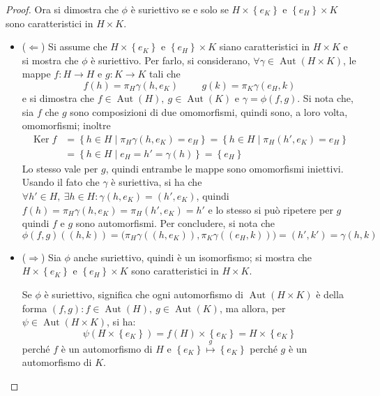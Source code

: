 \documentclass[12pt]{scrartcl}
\theoremstyle{style}
\numberwithin{equation}{subsection}
\begin{document}
\begin{proof}
Ora si dimostra che $\phi $ \`e suriettivo se e solo se $H \times \left\{ e_K \right\} $ e $\left\{ e_H \right\} \times K$ sono caratteristici in $H\times K$.
\begin{itemize}
	\item ($\Leftarrow $) Si assume che $H \times \left\{ e_K \right\} $ e $\left\{ e_H \right\} \times K$ siano caratteristici in $H \times K$ e si mostra che $\phi $ \`e suriettivo.
		Per farlo, si considerano, $\forall \gamma \in  \operatorname{Aut} (H \times K)$, le mappe $f: H \to H$ e $g : K \to K $ tali che
		\[
		f(h) = \pi_H \gamma(h,e_K) \hspace{1cm} g(k) = \pi_K \gamma(e_H,k)
		\] 
		e si dimostra che $f \in \operatorname{Aut} (H), \ g\in \operatorname{Aut} (K)$ e $\gamma = \phi (f,g)$.
		Si nota che, sia $f$ che $g$ sono composizioni di due omomorfismi, quindi sono, a loro volta, omomorfismi; inoltre
		\[
		\begin{split}
				\operatorname{Ker} f &= \left\{ h \in H  \mid \pi _H \gamma(h,e_K) = e_H \right\} = \left\{ h \in H  \mid \pi_H ( h', e_K) = e_H \right\} \\
						     &= \left\{ h \in H  \mid e_H = h'= \gamma(h) \right\} = \left\{ e_H \right\} 
		\end{split}
		\] 
	Lo stesso vale per $g$, quindi entrambe le mappe sono omomorfismi iniettivi.
	Usando il fato che $\gamma$ \`e suriettiva, si ha che $\forall h' \in  H , \ \exists h \in H : \gamma(h,e_K) = (h',e_K)$, quindi $f(h) = \pi_H \gamma(h,e_K) = \pi_H(h',e_K) = h'$ e lo stesso si pu\`o ripetere per $g$ quindi $f$ e $g$ sono automorfismi.
	Per concludere, si nota che
	\[
	\phi (f,g)((h,k)) = \big(\pi_H \gamma((h,e_K)),\pi_K \gamma((e_H,k))\big) = (h',k') = \gamma(h,k)
	\] 
\item ($\Rightarrow $) Sia $\phi $ anche suriettivo, quindi \`e un isomorfismo; si mostra che $H \times \left\{ e_K \right\} $ e $\left\{ e_ H\right\}  \times  K$ sono caratteristici in $H \times K$.

	Se $\phi  $ \`e suriettivo, significa che ogni automorfismo di $\operatorname{Aut} (H \times K) $ \`e della forma $(f,g) : f \in \operatorname{Aut} (H) , \ g \in \operatorname{Aut} (K)$, ma allora, per $\psi  \in  \operatorname{Aut}(H \times K )$, si ha:
	\[
	\psi (H \times \left\{ e_K \right\} ) = f(H) \times \left\{ e_K \right\} = H \times \left\{ e_K \right\} 
	\] 
	perch\'e $f$ \`e un automorfismo di $H$ e $\left\{ e_K \right\} \stackrel{g}{\longmapsto} \left\{ e_K \right\} $ perch\'e $g$ \`e un automorfismo di $K$.
\end{itemize}
	\end{proof}
\end{document}
